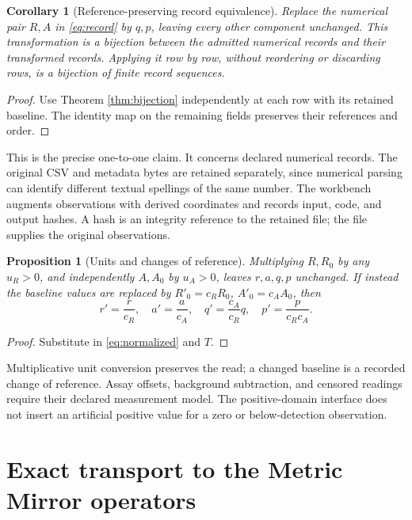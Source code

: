\documentclass[11pt]{article}
\newtheorem{proposition}[theorem]{Proposition}
\newtheorem{corollary}[theorem]{Corollary}
\begin{document}
\begin{corollary}[Reference-preserving record equivalence]\label{cor:record}
Replace the numerical pair \(R,A\) in \eqref{eq:record} by \(q,p\), leaving
every other component unchanged. This transformation is a bijection between
the admitted numerical records and their transformed records. Applying it
row by row, without reordering or discarding rows, is a bijection of finite
record sequences.
\end{corollary}
\begin{proof}
Use Theorem \ref{thm:bijection} independently at each row with its retained
baseline. The identity map on the remaining fields preserves their references
and order.
\end{proof}

This is the precise one-to-one claim. It concerns declared numerical records.
The original CSV and metadata bytes are retained separately, since numerical
parsing can identify different textual spellings of the same number.
The workbench augments observations with derived coordinates and records
input, code, and output hashes. A hash is an integrity reference to the
retained file; the file supplies the original observations.

\begin{proposition}[Units and changes of reference]\label{prop:units}
Multiplying \(R,R_0\) by any \(u_R>0\), and independently \(A,A_0\) by
\(u_A>0\), leaves \(r,a,q,p\) unchanged. If instead the baseline values
are replaced by \(R'_0=c_RR_0\), \(A'_0=c_AA_0\), then
\[
 r'=\frac r{c_R},\quad a'=\frac a{c_A},\quad
 q'=\frac{c_A}{c_R}q,\quad p'=\frac{p}{c_Rc_A}.
\]
\end{proposition}
\begin{proof}
Substitute in \eqref{eq:normalized} and \(T\).
\end{proof}
Multiplicative unit conversion preserves the read; a changed baseline is
a recorded change of reference. Assay offsets, background subtraction,
and censored readings require their declared measurement model.
The positive-domain interface does not insert an artificial positive value
for a zero or below-detection observation.

\section{Exact transport to the Metric Mirror operators}
\end{document}
